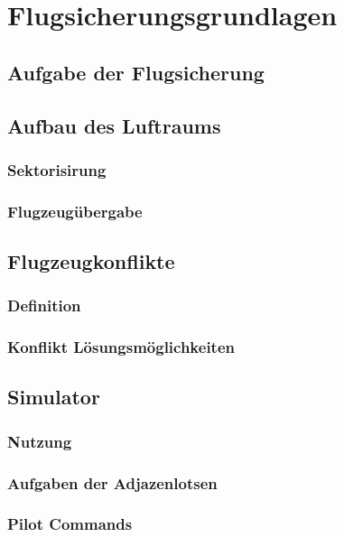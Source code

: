 \chapter{Flugsicherungsgrundlagen}
\label{ch:fs_grundlagen}

\section{Aufgabe der Flugsicherung}

\section{Aufbau des Luftraums}

\subsection{Sektorisirung}

\subsection{Flugzeugübergabe}

\section{Flugzeugkonflikte}

\subsection{Definition}

\subsection{Konflikt Lösungsmöglichkeiten}

\section{Simulator}

\subsection{Nutzung}

\subsection{Aufgaben der Adjazenlotsen}

\subsection{Pilot Commands}
